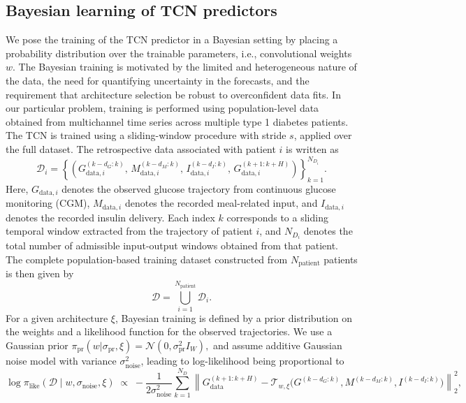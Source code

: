 \documentclass[preprint,12pt]{elsarticle}
\begin{document}
\subsection{Bayesian learning of TCN predictors}\label{sec:tcn_bayes}
We pose the training of the TCN predictor in a Bayesian setting by placing a probability distribution over the trainable parameters, i.e., convolutional weights \(w\). The Bayesian training is motivated by the limited and heterogeneous nature of the data, the need for quantifying uncertainty in the forecasts, and the requirement that architecture selection be robust to overconfident data fits.
%
In our particular problem, training is performed using population-level data obtained from multichannel time series across multiple type 1 diabetes patients. The TCN is trained using a sliding-window procedure with stride \(s\), applied over the full dataset. 
The retrospective data associated with patient $i$ is written as
%
\begin{equation}
\mathcal{D}_i
=
\left\{
\left(
G_{\mathrm{data}, i}^{(k-d_G:k)},\,
M_{\mathrm{data}, i}^{(k-d_M:k)},\,
I_{\mathrm{data}, i}^{(k-d_I:k)},\,
G_{\mathrm{data}, i}^{(k+1:k+H)}
\right)
\right\}_{k=1}^{N_{D_i}}.
\end{equation}
%
Here, \(G_{\mathrm{data}, i}\) denotes the observed glucose trajectory from continuous glucose monitoring (CGM), \(M_{\mathrm{data}, i}\) denotes the recorded meal-related input, and \(I_{\mathrm{data}, i}\) denotes the recorded insulin delivery.
Each index \(k\) corresponds to a sliding temporal window extracted from the trajectory of patient \(i\), and \(N_{D_i}\) denotes the total number of admissible input-output windows obtained from that patient.
%
The complete population-based training dataset constructed from \(N_{\mathrm{patient}}\) patients is then given by
%
\begin{equation}
\mathcal{D}
=
\bigcup_{i=1}^{N_{\mathrm{patient}}}
\mathcal{D}_i .
\end{equation}
%
For a given architecture \(\xi\), Bayesian training is defined by a prior distribution on the weights and a likelihood function for the observed trajectories. We use a Gaussian prior
$
\pi_{\mathrm{pr}}(w | \sigma_{\mathrm{pr}},\xi)
=
\mathcal{N}\!\left(0,\sigma_{\mathrm{pr}}^2 I_{W}\right),
$
%
and assume additive Gaussian noise model with variance \(\sigma_{\mathrm{noise}}^2\), leading to log-likelihood being proportional to
%
\begin{equation}
\log \pi_{\mathrm{like}}(\mathcal{D} \mid w,\sigma_{\mathrm{noise}},\xi)
\;\propto\;
-\frac{1}{2\sigma_{\mathrm{noise}}^2}
\sum_{k=1}^{N_D}
\left\|
G_{\mathrm{data}}^{(k+1:k+H)}
-
\mathcal{T}_{w,\xi}\!\big(G^{(k-d_G:k)}, M^{(k-d_M:k)}, I^{(k-d_I:k)}\big)
\right\|_2^2,
\end{equation}
\end{document}
